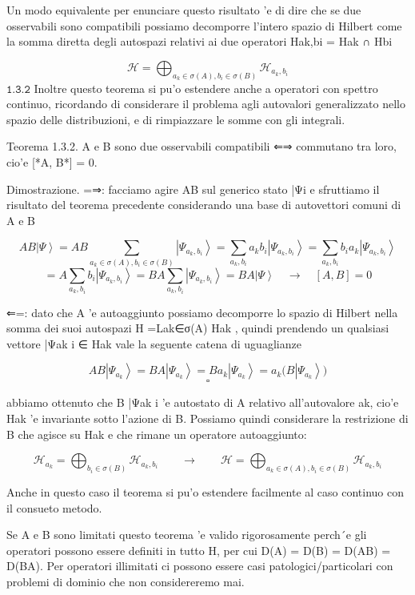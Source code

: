 {	Un modo equivalente per enunciare questo risultato 'e di dire che se due osservabili sono compatibili possiamo decomporre l'intero spazio di Hilbert come la somma diretta degli autospazi relativi ai due operatori Hak,bi =
	Hak ∩ Hbi
	
	$$\mathcal{H}=\bigoplus_{a_{k}\in\sigma(A),b_{i}\in\sigma(B)}\mathcal{H}_{a_{k},b_{i}}$$
	$\texttt{1.3.2}$
	Inoltre questo teorema si pu'o estendere anche a operatori con spettro continuo, ricordando di considerare il problema agli autovalori generalizzato nello spazio delle distribuzioni, e di rimpiazzare le somme con gli integrali.
	
	Teorema 1.3.2. A e B sono due osservabili compatibili ⇐⇒ commutano tra loro, cio'e [*A, B*] = 0.
	
	Dimostrazione. =⇒: facciamo agire AB sul generico stato |Ψi e sfruttiamo il risultato del teorema precedente considerando una base di autovettori comuni di A e B
	
	$$AB\left|\Psi\right\rangle=AB\sum_{a_{k}\in\sigma(A),b_{i}\in\sigma(B)}\left|\Psi_{a_{k},b_{i}}\right\rangle=\sum_{a_{k},b_{i}}a_{k}b_{i}\left|\Psi_{a_{k},b_{i}}\right\rangle=\sum_{a_{k},b_{i}}b_{i}a_{k}\left|\Psi_{a_{k},b_{i}}\right\rangle$$ $$=A\sum_{a_{k},b_{i}}b_{i}\left|\Psi_{a_{k},b_{i}}\right\rangle=BA\sum_{a_{k},b_{i}}\left|\Psi_{a_{k},b_{i}}\right\rangle=BA\left|\Psi\right\rangle\quad\longrightarrow\quad[A,B]=0$$
	
	⇐=: dato che A 'e autoaggiunto possiamo decomporre lo spazio di Hilbert nella somma dei suoi autospazi H =Lak∈σ(A) Hak
	, quindi prendendo un qualsiasi vettore |Ψak i ∈ Hak vale la seguente catena di uguaglianze
	
	$$A B\left|\Psi_{a_{k}}\right\rangle=B A\left|\Psi_{a_{k}}\right\rangle=B a_{k}\left|\Psi_{a_{k}}\right\rangle=a_{k}\big(B\left|\Psi_{a_{k}}\right\rangle\big)$$
	$$\square$$
	
	abbiamo ottenuto che B |Ψak i 'e autostato di A relativo all'autovalore ak, cio'e Hak
	'e invariante sotto l'azione di B. Possiamo quindi considerare la restrizione di B che agisce su Hak e che rimane un operatore autoaggiunto:
	
	$$\mathcal{H}_{a_{k}}=\bigoplus_{b_{i}\in\sigma(B)}\mathcal{H}_{a_{k},b_{i}}\qquad\longrightarrow\qquad\mathcal{H}=\bigoplus_{a_{k}\in\sigma(A),b_{i}\in\sigma(B)}\mathcal{H}_{a_{k},b_{i}}$$
	
	Anche in questo caso il teorema si pu'o estendere facilmente al caso continuo con il consueto metodo.
	
	Se A e B sono limitati questo teorema 'e valido rigorosamente perch´e gli operatori possono essere definiti in tutto H, per cui D(A) = D(B) = D(AB) = D(BA). Per operatori illimitati ci possono essere casi patologici/particolari con problemi di dominio che non considereremo mai.
	
}
